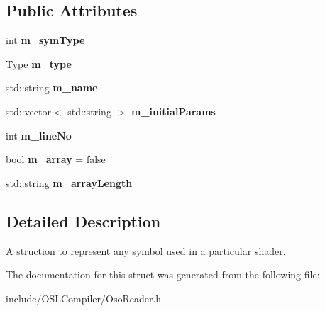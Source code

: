 \subsection*{Public Attributes}
\begin{DoxyCompactItemize}
\item 
\hypertarget{struct_symbol_af28fc7dfb146d888ebdc9b485ddc5f11}{int {\bfseries m\-\_\-sym\-Type}}\label{struct_symbol_af28fc7dfb146d888ebdc9b485ddc5f11}

\item 
\hypertarget{struct_symbol_af5bf82ba38afb55a51aa0b9e4cfd8b55}{Type {\bfseries m\-\_\-type}}\label{struct_symbol_af5bf82ba38afb55a51aa0b9e4cfd8b55}

\item 
\hypertarget{struct_symbol_ab8b6002d0d56fd0fba30354f7154eb95}{std\-::string {\bfseries m\-\_\-name}}\label{struct_symbol_ab8b6002d0d56fd0fba30354f7154eb95}

\item 
\hypertarget{struct_symbol_a81a6eeb4acba82c9f846244351772f6d}{std\-::vector$<$ std\-::string $>$ {\bfseries m\-\_\-initial\-Params}}\label{struct_symbol_a81a6eeb4acba82c9f846244351772f6d}

\item 
\hypertarget{struct_symbol_af6cc61623a7cdc6f06c66be31d179f55}{int {\bfseries m\-\_\-line\-No}}\label{struct_symbol_af6cc61623a7cdc6f06c66be31d179f55}

\item 
\hypertarget{struct_symbol_a2f9cb48112bd684d984bb852bffe4077}{bool {\bfseries m\-\_\-array} = false}\label{struct_symbol_a2f9cb48112bd684d984bb852bffe4077}

\item 
\hypertarget{struct_symbol_a9de2c5afb13ed16dfe95ea161b8bf07e}{std\-::string {\bfseries m\-\_\-array\-Length}}\label{struct_symbol_a9de2c5afb13ed16dfe95ea161b8bf07e}

\end{DoxyCompactItemize}


\subsection{Detailed Description}
A struction to represent any symbol used in a particular shader. 

The documentation for this struct was generated from the following file\-:\begin{DoxyCompactItemize}
\item 
include/\-O\-S\-L\-Compiler/Oso\-Reader.\-h\end{DoxyCompactItemize}
